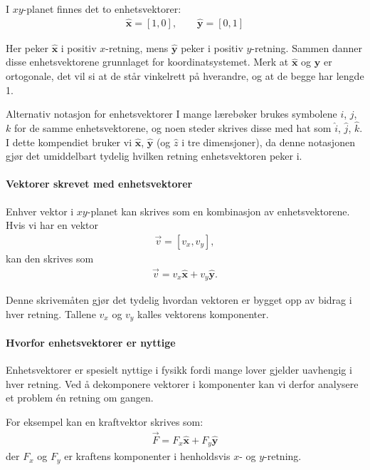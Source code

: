I $xy$-planet finnes det to enhetsvektorer:
\begin{align}
\hat{\mathbf{x}} = [1,0], \qquad \hat{\mathbf{y}} = [0,1]
\end{align}

Her peker $\hat{\mathbf{x}}$ i positiv $x$-retning, mens $\hat{\mathbf{y}}$ peker i positiv $y$-retning. Sammen danner disse enhetsvektorene grunnlaget for koordinatsystemet.
Merk at $\hat{\mathbf{x}}$ og $\hat{\mathbf{y}}$ er ortogonale, det vil si at de står vinkelrett på hverandre, og at de begge har lengde 1.
\begin{mymerk*}{Alternativ notasjon for enhetsvektorer}
I mange lærebøker brukes symbolene $i$, $j$, $k$ for de samme enhetsvektorene, og noen steder skrives disse med hat som $\hat{i}$, $\hat{j}$, $\hat{k}$. I dette kompendiet bruker vi $\hat{\mathbf{x}}$, $\hat{\mathbf{y}}$ (og $\hat{z}$ i tre dimensjoner), da denne notasjonen gjør det umiddelbart tydelig hvilken retning enhetsvektoren peker i.
\end{mymerk*}

\paragraph{Vektorer skrevet med enhetsvektorer}

Enhver vektor i $xy$-planet kan skrives som en kombinasjon av enhetsvektorene. Hvis vi har en vektor
\begin{align}
\vec{v} = [v_x, v_y],
\end{align}
kan den skrives som
\begin{align}
\vec{v} = v_x \hat{\mathbf{x}} + v_y \hat{\mathbf{y}}.
\end{align}

Denne skrivemåten gjør det tydelig hvordan vektoren er bygget opp av bidrag i hver retning. Tallene $v_x$ og $v_y$ kalles vektorens komponenter.

\paragraph{Hvorfor enhetsvektorer er nyttige}

Enhetsvektorer er spesielt nyttige i fysikk fordi mange lover gjelder uavhengig i hver retning. Ved å dekomponere vektorer i komponenter kan vi derfor analysere et problem én retning om gangen.

For eksempel kan en kraftvektor skrives som:
\begin{align}
\vec{F} = F_x \hat{\mathbf{x}} + F_y \hat{\mathbf{y}}
\end{align}
der $F_x$ og $F_y$ er kraftens komponenter i henholdsvis $x$- og $y$-retning.

